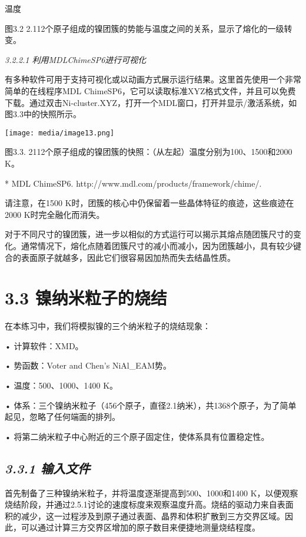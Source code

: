 \documentclass[
]{article}
\begin{document}
温度

图3.2
2.112个原子组成的镍团簇的势能与温度之间的关系，显示了熔化的一级转变。

\emph{3.2.2.1 利用MDLChimeSP6进行可视化}

有多种软件可用于支持可视化或以动画方式展示运行结果。这里首先使用一个非常简单的在线程序MDL
ChimeSP6，它可以读取标准XYZ格式文件，并且可以免费下载。通过双击Ni-cluster.XYZ，打开一个MDL窗口，打开并显示/激活系统，如图3.3中的快照所示。

\texttt{[image: media/image13.png]}

图3.3. 2112个原子组成的镍团簇的快照：（从左起）温度分别为100、1500和2000
K。

* MDL ChimeSP6. http://www.mdl.com/products/framework/chime/.

请注意，在1500
K时，团簇的核心中仍保留着一些晶体特征的痕迹，这些痕迹在2000
K时完全融化而消失。

对于不同尺寸的镍团簇，进一步以相似的方式运行可以揭示其熔点随团簇尺寸的变化。通常情况下，熔化点随着团簇尺寸的减小而减小，因为团簇越小，具有较少键合的表面原子就越多，因此它们很容易因加热而失去结晶性质。

\hypertarget{ux954dux7eb3ux7c73ux7c92ux5b50ux7684ux70e7ux7ed3}{%
\section{3.3
镍纳米粒子的烧结}\label{ux954dux7eb3ux7c73ux7c92ux5b50ux7684ux70e7ux7ed3}}

在本练习中，我们将模拟镍的三个纳米粒子的烧结现象：

• 计算软件：XMD。

• 势函数：Voter and Chen's NiAl\_EAM势。

• 温度：500、1000、1400 K。

•
体系：三个镍纳米粒子（456个原子，直径2.1纳米），共1368个原子，为了简单起见，忽略了任何端面的排列。

• 将第二纳米粒子中心附近的三个原子固定住，使体系具有位置稳定性。

\hypertarget{ux8f93ux5165ux6587ux4ef6-1}{%
\subsection{\texorpdfstring{\emph{3.3.1
输入文件}}{3.3.1 输入文件}}\label{ux8f93ux5165ux6587ux4ef6-1}}

首先制备了三种镍纳米粒子，并将温度逐渐提高到500、1000和1400
K，以便观察烧结阶段，并通过2.5.1讨论的速度标度来观察温度升高。烧结的驱动力来自表面积的减少，这一过程涉及到原子通过表面、晶界和体积扩散到三方交界区域。因此，可以通过计算三方交界区增加的原子数目来便捷地测量烧结程度。
\end{document}
